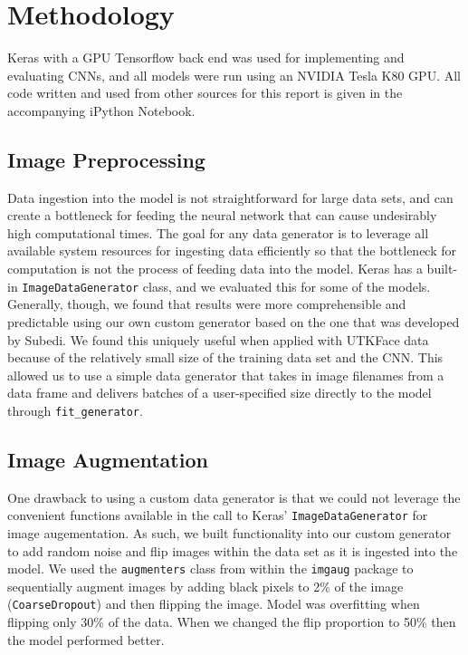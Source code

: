 \documentclass[obeyspaces, spaces, fleqn,10pt]{SelfArx} %
\begin{document}

\section{Methodology}

Keras with a GPU Tensorflow back end was used for implementing and evaluating CNNs, and all models were run using an NVIDIA Tesla K80 GPU. All code written and used from other sources for this report is given in the accompanying iPython Notebook. 

\subsection{Image Preprocessing}

Data ingestion into the model is not straightforward for large data sets, and can create a bottleneck for feeding the neural network that can cause undesirably high computational times. The goal for any data generator is to leverage all available system resources for ingesting data efficiently so that the bottleneck for computation is not the process of feeding data into the model.\cite{amidi} Keras has a built-in \texttt{ImageDataGenerator} class, and we evaluated this for some of the models. Generally, though, we found that results were more comprehensible and predictable using our own custom generator based on the one that was developed by Subedi. We found this uniquely useful when applied with UTKFace data because of the relatively small size of the training data set and the CNN. This allowed us to use a simple data generator that takes in image filenames from a data frame and delivers batches of a user-specified size directly to the model through \texttt{fit_generator}. 

\subsection{Image Augmentation}

One drawback to using a custom data generator is that we could not leverage the convenient functions available in the call to Keras' \texttt{ImageDataGenerator} for image augementation. As such, we built functionality into our custom generator to add random noise and flip images within the data set as it is ingested into the model. We used the \texttt{augmenters} class from within the \texttt{imgaug} package to sequentially augment images by adding black pixels to 2\% of the image (\texttt{CoarseDropout}) and then flipping the image.  Model was overfitting when flipping only 30\% of the data. When we changed the flip proportion to 50\% then the model performed better. 
\end{document}
